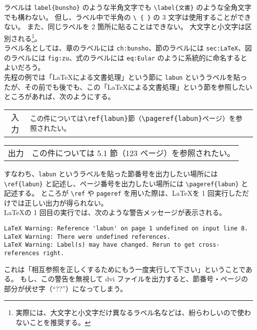 ラベルは \verb'label{bunsho}' のような半角文字でも \verb'\label{文書}' のような全角文字でも構わない。
但し、ラベル中で半角の \verb'\ { }' の 3 文字は使用することができない。
また、同じラベルを 2 箇所に貼ることはできない。
大文字と小文字は区別される\footnote{実際には、大文字と小文字だけ異なるラベル名などは、紛らわしいので使わないことを推奨する。}。\\

ラベル名としては、章のラベルには \texttt{ch:bunsho}、節のラベルには \texttt{sec:LaTeX}、図のラベルには \texttt{fig:zu}、式のラベルには \texttt{eq:Eular} のように系統的に命名するとよいだろう。\\

先程の例では「\LaTeX{}による文書処理」という節に \texttt{labun} というラベルを貼ったが、その前でも後でも、この「\LaTeX{}による文書処理」という節を参照したいところがあれば、次のようにする。
\begin{longtable}[l]{@{}c|l@{}}
  入力 & \verb'この件については\ref{labun}節（\pageref{labun}ページ）を参照されたい。' \\
\end{longtable}
\begin{longtable}[l]{@{}c|l@{}}
  出力 & この件については 5.1 節（123 ページ）を参照されたい。\\
\end{longtable}
すなわち、\texttt{labun} というラベルを貼った節番号を出力したい場所には \verb'\ref{labun}' と記述し、ページ番号を出力したい場所には \verb'\pageref{labun}' と記述する。
ところが \verb'\ref' や \verb'pageref' を用いた際は、\LaTeX{}を 1 回実行しただけでは正しい出力が得られない。\\

\LaTeX{}の 1 回目の実行では、次のような警告メッセージが表示される。
\begin{mdframed}[roundcorner=0.50zw,leftmargin=3.00zw,rightmargin=3.00zw,skipabove=0.40zw,skipbelow=0.40zw,innertopmargin=4.00pt,innerbottommargin=4.00pt,innerleftmargin=5.00pt,innerrightmargin=5.00pt,linecolor=gray!090,linewidth=0.50pt,backgroundcolor=gray!90]\color{gray!10}
\begin{verbatim}
LaTeX Warning: Reference 'labun' on page 1 undefined on input line 8.
LaTeX Warning: There were undefined references.
LaTeX Warning: Label(s) may have changed. Rerun to get cross-references right.
\end{verbatim}
\end{mdframed}
これは「相互参照を正しくするためにもう一度実行して下さい」ということである。
もし、この警告を無視して dvi ファイルを出力すると、節番号・ページの部分が伏せ字（``??''）になってしまう。\\

